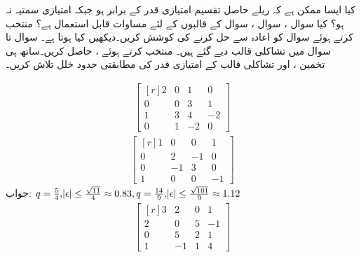 کیا ایسا ممکن ہے کہ ریلے حاصل تقسیم  امتیازی قدر کے برابر ہو جبکہ  امتیازی سمتیہ نہ ہو؟
\quad 
کیا سوال ، سوال ، سوال  کے قالبوں کے  لئے مساوات  قابل  استعمال ہے؟
\quad
{} منتخب کرتے ہوئے سوال  کو اعادہ سے حل کرنے کی کوشش کریں۔دیکھیں کیا ہوتا ہے۔
سوال  تا سوال  میں تشاکلی قالب دیے گئے ہیں۔  منتخب کرتے ہوئے ،  حاصل کریں۔ساتھ ہی  تخمین  ، 
   اور تشاکلی قالب کے امتیازی قدر کی مطابقتی حدود خلل تلاش کریں۔ 

\quad
\begin{align*}
\begin{bmatrix*}[r] 2&0&1&0\\ 0&0&3&1\\1&3&4&-2\\0&1&-2&0  \end{bmatrix*}
\end{align*}
\quad
\begin{align*}
\begin{bmatrix*}[r] 1&0&0&1\\ 0&2&-1&0\\0&-1&3&0\\1&0&0&-1  \end{bmatrix*}
\end{align*}
جواب:\quad
$q=\tfrac{5}{4},\abs{\epsilon}\le \tfrac{\sqrt{11}}{4}\approx 0.83, q=\tfrac{14}{9},\abs{\epsilon}\le \tfrac{\sqrt{101}}{9}\approx 1.12$
\quad
\begin{align*}
\begin{bmatrix*}[r] 3&2&0&1\\2&0&5&-1\\0&5&2&1\\1&-1&1&4 \end{bmatrix*}
\end{align*}

